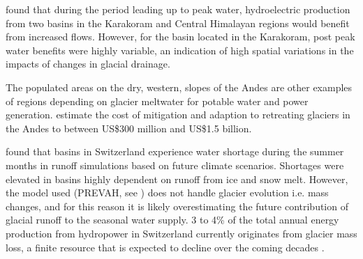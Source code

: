 \documentclass[12pt, a4paper]{article}
\begin{document}
\textcite{mishraDifferentialImpactClimate2020} found that during the
period leading up to peak water, hydroelectric production from two basins in the
Karakoram and Central Himalayan regions would benefit from increased flows.
However, for the basin located in the Karakoram, post peak water benefits were
highly variable, an indication of high spatial variations in the impacts of
changes in glacial drainage.

The populated areas on the dry, western, slopes of the Andes are other examples
of regions depending on glacier meltwater for potable water and power
generation. \textcite{vergaraEconomicImpactsRapid2007} estimate the cost of
mitigation and adaption to retreating glaciers in the Andes to between US\$300
million and US\$1.5 billion.

\textcite{brunnerPresentFutureWater2019} found that basins in Switzerland
experience water shortage during the summer months in runoff simulations based
on future climate scenarios. Shortages were elevated in basins highly dependent
on runoff from ice and snow melt. However, the model used (PREVAH, see
\cite{viviroliIntroductionHydrologicalModelling2009}) does not handle glacier
evolution i.e. mass changes, and for this reason it is likely overestimating the
future contribution of glacial runoff to the seasonal water supply. 3 to 4\% of
the total annual energy production from hydropower in Switzerland currently
originates from glacier mass loss, a finite resource that is expected to decline
over the coming decades \parencite{schaefliRoleGlacierRetreat2019}. 




\end{document}
